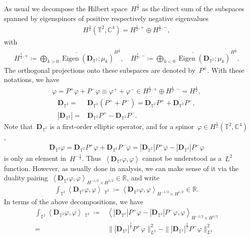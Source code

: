 \documentclass[10pt,a4paper]{amsart}
\newcommand{\R}{\mathbb{R}}
\newcommand{\C}{\mathbb{C}}
\newcommand{\T}{\mathbb{T}}
\newcommand{\dd}{\mathop{}\!\mathrm{d}}
\newcommand{\pD}{\mathbf{D}}
\newcommand{\Abracket}[1]{\left<#1\right>} %
\DeclareMathOperator{\dv}{\dd{vol}}
\DeclareMathOperator{\Eigen}{Eigen}
\begin{document}
As usual we decompose the Hilbert space~$H^{\frac{1}{2}}$ as the direct sum of the subspaces spanned by eigenspinors of positive respectively negative eigenvalues
\begin{align}
    H^{\frac{1}{2}}(\mathbb{T}^2,\C^4)= H^{\frac{1}{2},+}\oplus H^{\frac{1}{2},-}, 
\end{align}
with 
\begin{align}
    H^{\frac{1}{2},+}\coloneqq \overline{ \bigoplus_{k>0} \Eigen(\pD_{\T^2};\mu_k) }^{H^{\frac{1}{2}}}, \quad 
    H^{\frac{1}{2},-}\coloneqq \overline{ \bigoplus_{k<0} \Eigen(\pD_{\T^2};\mu_k) }^{H^{\frac{1}{2}}} . 
\end{align}
The orthogonal projections onto these subspaces are denoted by~$P^{\pm}$. 
With these notations, we have 
\begin{align}
    \varphi=P^+\varphi + P^-\varphi \equiv \varphi^+ + \varphi^- \in H^{\frac{1}{2},+}\oplus H^{\frac{1}{2},-}=H^{\frac{1}{2}}, 
\end{align}
\begin{align}
    \pD_{\T^2}=&\pD_{\T^2}(P^+ + P^-) = \pD_{\T^2} P^+ + \pD_{\T^2} P^-,  \\
    |\pD_{\T^2}|=& \pD_{\T^2} P^+ - \pD_{\T^2} P^-. 
\end{align}
Note that~$\pD_{\T^2}$ is a first-order elliptic operator, and for a spinor~$\varphi\in H^{\frac{1}{2}}(\T^2,\C^4)$, 
\begin{align}
    \pD_{\T^2}\varphi = \pD_{\T^2}P^+\varphi + \pD_{\T^2}P^-\varphi 
    =|\pD_{\T^2}|P^+\varphi - |\pD_{\T^2}|P^-\varphi 
\end{align}
is only an element in~$H^{-\frac{1}{2}}$.
Thus~$\Abracket{\pD_{\T^2}\varphi,\varphi}$ cannot be understood as a~$L^2$ function. 
However, as usually done in analysis, we can make sense of it via the duality pairing~$\Abracket{\pD_{\T^2}\varphi,\varphi}_{H^{-1/2}\times H^{1/2}}\in \R$, and write 
\begin{align}
    \int_{\T^2}\Abracket{\pD_{\T^2}\varphi,\varphi}\dv_{\T^2}
    \coloneqq 
    \Abracket{\pD_{\T^2}\varphi,\varphi}_{H^{-1/2}\times H^{1/2}}\in \R. 
\end{align}
In terms of the above decompositions, we have 
\begin{align}
    \int_{\T^2}\Abracket{\pD_{\T^2}\varphi,\varphi}\dv_{\T^2}
    \coloneqq & 
    \Abracket{|\pD_{\T^2}|P^+\varphi - |\pD_{\T^2}|P^-\varphi ,\varphi}_{H^{-1/2}\times H^{1/2}} \\
    =&\| |\pD_{\T^2}|^{\frac{1}{2}}P^+\varphi\|_{L^2}^2 
     - \| |\pD_{\T^2}|^{\frac{1}{2}}P^-\varphi\|_{L^2}^2
\end{align}
\end{document}
